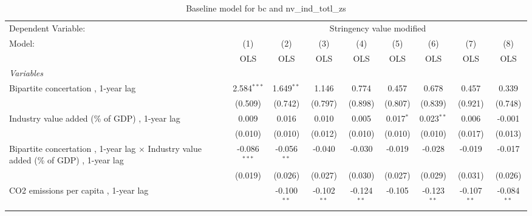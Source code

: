 
\begin{table}[htbp]
   \caption{Baseline model for bc and nv\_ind\_totl\_zs}
   \centering
   \begin{tabular}{lcccccccc}
      \toprule
      Dependent Variable: & \multicolumn{8}{c}{Stringency value modified}\\
      Model:                                                                                       & (1)            & (2)           & (3)           & (4)           & (5)          & (6)           & (7)           & (8)\\  
                                                                                                   &  OLS           & OLS           & OLS           & OLS           & OLS          & OLS           & OLS           & OLS\\  
      \midrule
      \emph{Variables}\\
      Bipartite concertation , 1-year lag                                                          & 2.584$^{***}$  & 1.649$^{**}$  & 1.146         & 0.774         & 0.457        & 0.678         & 0.457         & 0.339\\   
                                                                                                   & (0.509)        & (0.742)       & (0.797)       & (0.898)       & (0.807)      & (0.839)       & (0.921)       & (0.748)\\   
      Industry value added (\% of GDP) , 1-year lag                                                & 0.009          & 0.016         & 0.010         & 0.005         & 0.017$^{*}$  & 0.023$^{**}$  & 0.006         & -0.001\\   
                                                                                                   & (0.010)        & (0.010)       & (0.012)       & (0.010)       & (0.010)      & (0.010)       & (0.017)       & (0.013)\\   
      Bipartite concertation , 1-year lag $\times$ Industry value added (\% of GDP) , 1-year lag   & -0.086$^{***}$ & -0.056$^{**}$ & -0.040        & -0.030        & -0.019       & -0.028        & -0.019        & -0.017\\   
                                                                                                   & (0.019)        & (0.026)       & (0.027)       & (0.030)       & (0.027)      & (0.029)       & (0.031)       & (0.026)\\   
      CO2 emissions per capita , 1-year lag                                                        &                & -0.100$^{**}$ & -0.102$^{**}$ & -0.124$^{**}$ & -0.105       & -0.123$^{**}$ & -0.107$^{**}$ & -0.084$^{**}$\\   

\end{tabular}
\end{table}

